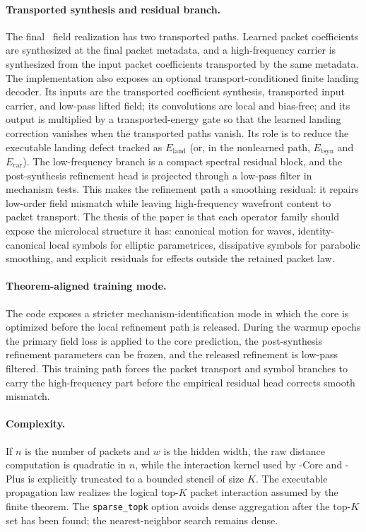 \paragraph{Transported synthesis and residual branch.}
The final \MiNO\ field realization has two transported paths.  Learned packet coefficients are synthesized at the final packet metadata, and a high-frequency carrier is synthesized from the input packet coefficients transported by the same metadata.  The implementation also exposes an optional transport-conditioned finite landing decoder.  Its inputs are the transported coefficient synthesis, transported input carrier, and low-pass lifted field; its convolutions are local and bias-free; and its output is multiplied by a transported-energy gate so that the learned landing correction vanishes when the transported paths vanish.  Its role is to reduce the executable landing defect tracked as $E_{\mathrm{land}}$ (or, in the nonlearned path, $E_{\mathrm{tsyn}}$ and $E_{\mathrm{car}}$).  The low-frequency branch is a compact spectral residual block, and the post-synthesis refinement head is projected through a low-pass filter in mechanism tests. This makes the refinement path a smoothing residual: it repairs low-order field mismatch while leaving high-frequency wavefront content to packet transport. The thesis of the paper is that each operator family should expose the microlocal structure it has: canonical motion for waves, identity-canonical local symbols for elliptic parametrices, dissipative symbols for parabolic smoothing, and explicit residuals for effects outside the retained packet law.

\paragraph{Theorem-aligned training mode.}
The code exposes a stricter mechanism-identification mode in which the core is optimized before the local refinement path is released. During the warmup epochs the primary field loss is applied to the core prediction, the post-synthesis refinement parameters can be frozen, and the released refinement is low-pass filtered. This training path forces the packet transport and symbol branches to carry the high-frequency part before the empirical residual head corrects smooth mismatch.

\paragraph{Complexity.}
If $n$ is the number of packets and $w$ is the hidden width, the raw distance computation is quadratic in $n$, while the interaction kernel used by \MiNO-Core and \MiNO-Plus is explicitly truncated to a bounded stencil of size $K$. The executable propagation law realizes the logical top-$K$ packet interaction assumed by the finite theorem. The \texttt{sparse\_topk} option avoids dense aggregation after the top-$K$ set has been found; the nearest-neighbor search remains dense.


